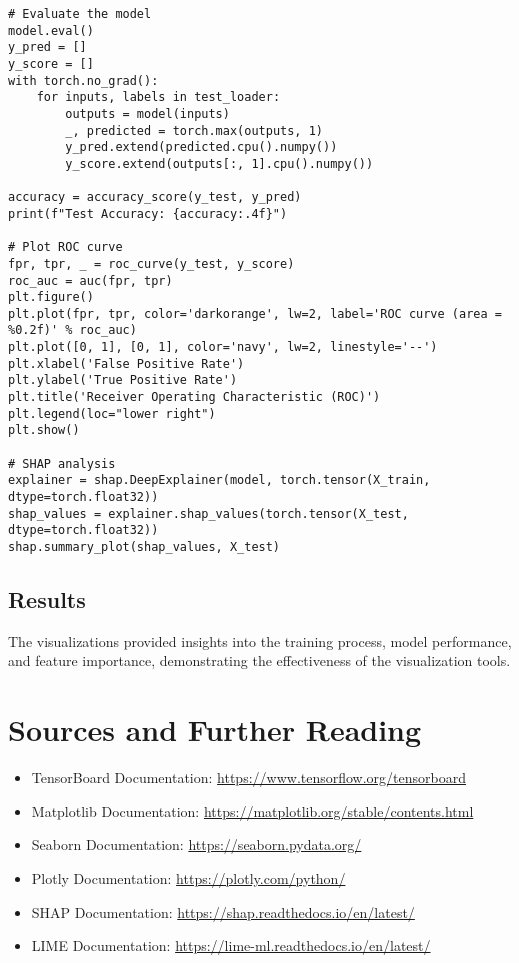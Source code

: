 \begin{verbatim}
# Evaluate the model
model.eval()
y_pred = []
y_score = []
with torch.no_grad():
    for inputs, labels in test_loader:
        outputs = model(inputs)
        _, predicted = torch.max(outputs, 1)
        y_pred.extend(predicted.cpu().numpy())
        y_score.extend(outputs[:, 1].cpu().numpy())

accuracy = accuracy_score(y_test, y_pred)
print(f"Test Accuracy: {accuracy:.4f}")

# Plot ROC curve
fpr, tpr, _ = roc_curve(y_test, y_score)
roc_auc = auc(fpr, tpr)
plt.figure()
plt.plot(fpr, tpr, color='darkorange', lw=2, label='ROC curve (area = %0.2f)' % roc_auc)
plt.plot([0, 1], [0, 1], color='navy', lw=2, linestyle='--')
plt.xlabel('False Positive Rate')
plt.ylabel('True Positive Rate')
plt.title('Receiver Operating Characteristic (ROC)')
plt.legend(loc="lower right")
plt.show()

# SHAP analysis
explainer = shap.DeepExplainer(model, torch.tensor(X_train, dtype=torch.float32))
shap_values = explainer.shap_values(torch.tensor(X_test, dtype=torch.float32))
shap.summary_plot(shap_values, X_test)
\end{verbatim}

\subsection{Results}
The visualizations provided insights into the training process, model performance, and feature importance, demonstrating the effectiveness of the visualization tools.

\section{Sources and Further Reading}
\begin{itemize}
    \item TensorBoard Documentation: \url{https://www.tensorflow.org/tensorboard}
    \item Matplotlib Documentation: \url{https://matplotlib.org/stable/contents.html}
    \item Seaborn Documentation: \url{https://seaborn.pydata.org/}
    \item Plotly Documentation: \url{https://plotly.com/python/}
    \item SHAP Documentation: \url{https://shap.readthedocs.io/en/latest/}
    \item LIME Documentation: \url{https://lime-ml.readthedocs.io/en/latest/}
\end{itemize}

